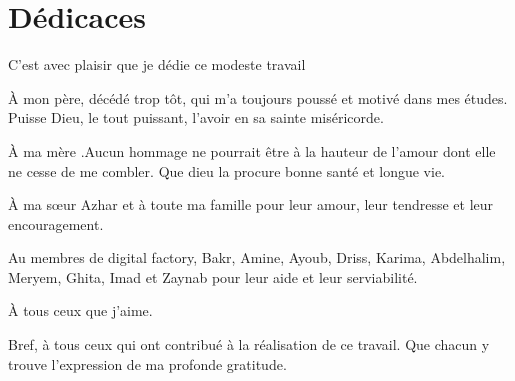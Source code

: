 \chapter*{D\'edicaces}

\begin{center}

C'est avec plaisir que je d\'edie ce modeste travail

\vspace{1.5\baselineskip}

\`A mon p\`ere, d\'ec\'ed\'e trop t\^ot, qui m'a toujours pouss\'e et motiv\'e dans mes \'etudes. Puisse Dieu, le tout puissant, l'avoir en sa sainte mis\'ericorde.

\vspace{1.5\baselineskip}

\`A ma m\`ere .Aucun hommage ne pourrait \^etre \`a la hauteur de l'amour dont elle ne cesse de me combler. Que dieu la procure bonne sant\'e et longue vie.

\vspace{1.5\baselineskip}

\`A ma s\oe{}ur Azhar et \`a toute ma famille pour leur amour, leur tendresse et leur encouragement.

\vspace{1.5\baselineskip}

Au membres de digital factory, Bakr, Amine, Ayoub, Driss, Karima, Abdelhalim, Meryem, Ghita, Imad et Zaynab pour leur aide et leur serviabilit\'e.

\vspace{1.5\baselineskip}

\`A tous ceux que j'aime.

\vspace{1.5\baselineskip}

Bref, \`a tous ceux qui ont contribu\'e \`a la r\'ealisation de ce travail. Que chacun y trouve l'expression de ma profonde gratitude.

\vspace{1.5\baselineskip}

\end{center}